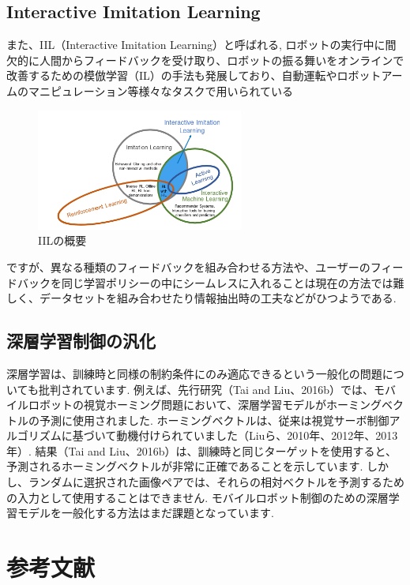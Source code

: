 \documentclass[a4j, twocolumn, 10pt,pdflatex,ja=standard]{bxjsarticle}
\begin{document}
\subsection{Interactive Imitation Learning}
また、IIL（Interactive Imitation Learning）と呼ばれる, ロボットの実行中に間欠的に人間からフィードバックを受け取り、ロボットの振る舞いをオンラインで改善するための模倣学習（IL）の手法も発展しており、自動運転やロボットアームのマニピュレーション等様々なタスクで用いられている\cite{iil}
\begin{figure}[htbp]
 \begin{center}
 \includegraphics[height=4cm]{./figure/iil.png}
 \caption{IILの概要}
 \end{center}
\end{figure}
\vspace{-9mm}
ですが、異なる種類のフィードバックを組み合わせる方法や、ユーザーのフィードバックを同じ学習ポリシーの中にシームレスに入れることは現在の方法では難しく、データセットを組み合わせたり情報抽出時の工夫などがひつようである. 


\subsection{深層学習制御の汎化}

深層学習は、訓練時と同様の制約条件にのみ適応できるという一般化の問題についても批判されています. 例えば、先行研究（Tai and Liu、2016b）では、モバイルロボットの視覚ホーミング問題において、深層学習モデルがホーミングベクトルの予測に使用されました. ホーミングベクトルは、従来は視覚サーボ制御アルゴリズムに基づいて動機付けられていました（Liuら、2010年、2012年、2013年）. 結果（Tai and Liu、2016b）は、訓練時と同じターゲットを使用すると、予測されるホーミングベクトルが非常に正確であることを示しています. しかし、ランダムに選択された画像ペアでは、それらの相対ベクトルを予測するための入力として使用することはできません. モバイルロボット制御のための深層学習モデルを一般化する方法はまだ課題となっています. 


\section{参考文献}
\end{document}
